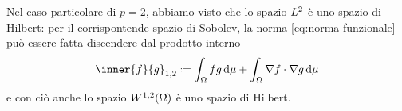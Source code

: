 Nel caso particolare di $p=2$, abbiamo visto che lo spazio $\lclass[2]$ è uno spazio di Hilbert: per il corrispontende spazio di Sobolev, la norma \eqref{eq:norma-funzionale} può essere fatta discendere dal prodotto interno
\begin{equation}
    \inner{f}{g}_{1,2}\defeq
    \int_\Omega fg\,\dd\mu+\int_\Omega \scalar{\grad f}{\grad g}\,\dd\mu
    \label{eq:prodotto-interno-W12}
\end{equation}
e con ciò anche lo spazio $\sobW[1,2]{\Omega}$ è uno spazio di Hilbert.
